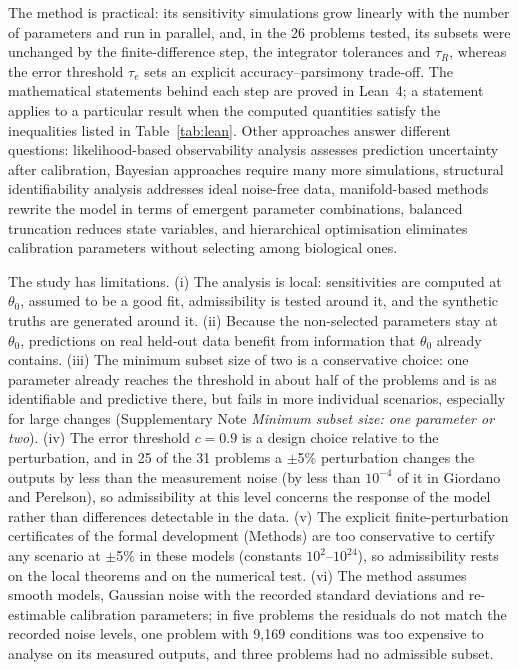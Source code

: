 \documentclass[pdflatex,sn-nature]{sn-jnl}
\theoremstyle{plain}
\begin{document}
The method is practical: its sensitivity simulations grow linearly with the number of parameters and run in parallel, and, in the 26 problems tested, its subsets were unchanged by the finite-difference step, the integrator tolerances and $\tau_R$, whereas the error threshold $\tau_e$ sets an explicit accuracy--parsimony trade-off. The mathematical statements behind each step are proved in Lean~4; a statement applies to a particular result when the computed quantities satisfy the inequalities listed in Table~\ref{tab:lean}. Other approaches answer different questions: likelihood-based observability analysis\cite{bib17} assesses prediction uncertainty after calibration, Bayesian approaches\cite{bib20} require many more simulations, structural identifiability analysis\cite{bib4,bib10,bib29} addresses ideal noise-free data, manifold-based methods\cite{bib36} rewrite the model in terms of emergent parameter combinations, balanced truncation\cite{bib22,bib1} reduces state variables, and hierarchical optimisation\cite{bib39} eliminates calibration parameters without selecting among biological ones.

The study has limitations. (i) The analysis is local: sensitivities are computed at $\theta_0$, assumed to be a good fit, admissibility is tested around it, and the synthetic truths are generated around it. (ii) Because the non-selected parameters stay at $\theta_0$, predictions on real held-out data benefit from information that $\theta_0$ already contains. (iii) The minimum subset size of two is a conservative choice: one parameter already reaches the threshold in about half of the problems and is as identifiable and predictive there, but fails in more individual scenarios, especially for large changes (Supplementary Note \textit{Minimum subset size: one parameter or two}). (iv) The error threshold $c=0.9$ is a design choice relative to the perturbation, and in 25 of the 31 problems a $\pm$5\% perturbation changes the outputs by less than the measurement noise (by less than $10^{-4}$ of it in Giordano and Perelson), so admissibility at this level concerns the response of the model rather than differences detectable in the data. (v) The explicit finite-perturbation certificates of the formal development (Methods) are too conservative to certify any scenario at $\pm$5\% in these models (constants $10^2$--$10^{24}$), so admissibility rests on the local theorems and on the numerical test. (vi) The method assumes smooth models, Gaussian noise with the recorded standard deviations and re-estimable calibration parameters; in five problems the residuals do not match the recorded noise levels, one problem with 9,169 conditions was too expensive to analyse on its measured outputs, and three problems had no admissible subset.
\end{document}
